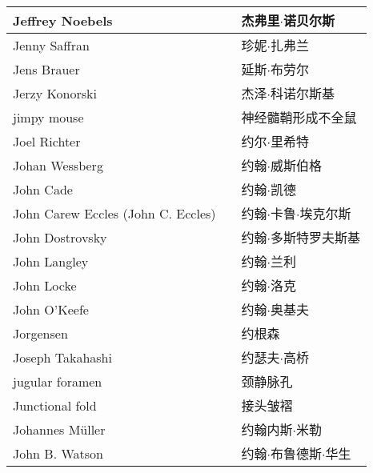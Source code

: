 \begin{longtable}{lll}
	\midrule
	Jeffrey Noebels   && 杰弗里$\cdot$诺贝尔斯  \\
	
	\midrule
	Jenny Saffran   && 珍妮$\cdot$扎弗兰  \\
	
	\midrule
	Jens Brauer   && 延斯$\cdot$布劳尔  \\
	
	\midrule
	Jerzy Konorski   && 杰泽$\cdot$科诺尔斯基  \\
	
	\midrule
	jimpy mouse   && 神经髓鞘形成不全鼠  \\
	
	\midrule
	Joel Richter   && 约尔$\cdot$里希特  \\
	
	\midrule
	Johan Wessberg   && 约翰$\cdot$威斯伯格  \\
	
	\midrule
	John Cade   && 约翰$\cdot$凯德  \\
	
	\midrule
	John Carew Eccles (John C. Eccles)   && 约翰$\cdot$卡鲁$\cdot$埃克尔斯  \\
	
	\midrule
	John Dostrovsky   && 约翰$\cdot$多斯特罗夫斯基  \\
	
	\midrule
	John Langley   && 约翰$\cdot$兰利  \\
	
	\midrule
	John Locke   && 约翰$\cdot$洛克  \\
	
	\midrule
	John O’Keefe   && 约翰$\cdot$奥基夫  \\
	
	\midrule
	Jorgensen   && 约根森  \\
	
	\midrule
	Joseph Takahashi   && 约瑟夫$\cdot$高桥  \\
	
	\midrule
	jugular foramen   && 颈静脉孔  \\
	
	\midrule
	Junctional fold   && 接头皱褶  \\
	
	\midrule
	Johannes Müller   && 约翰内斯$\cdot$米勒  \\
	
	\midrule
	John B. Watson   && 约翰$\cdot$布鲁德斯$\cdot$华生  \\
	

\end{longtable}
